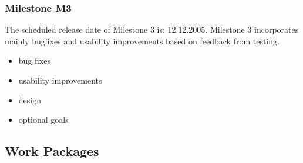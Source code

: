 \documentclass[11pt,a4paper]{article}
\begin{document}
\subsubsection{Milestone M3}

The scheduled release date of Milestone 3 is: 12.12.2005. Milestone 3 incorporates mainly bugfixes and
usability improvements based on feedback from testing.

\begin{itemize}
 \item bug fixes
 \item usability improvements
 \item design
 \item optional goals
\end{itemize}

\newpage
\subsection{Work Packages}


%
%
\end{document}
